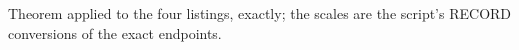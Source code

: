 Theorem  applied to the four listings, exactly; the scales are the script's RECORD conversions of the exact endpoints.
